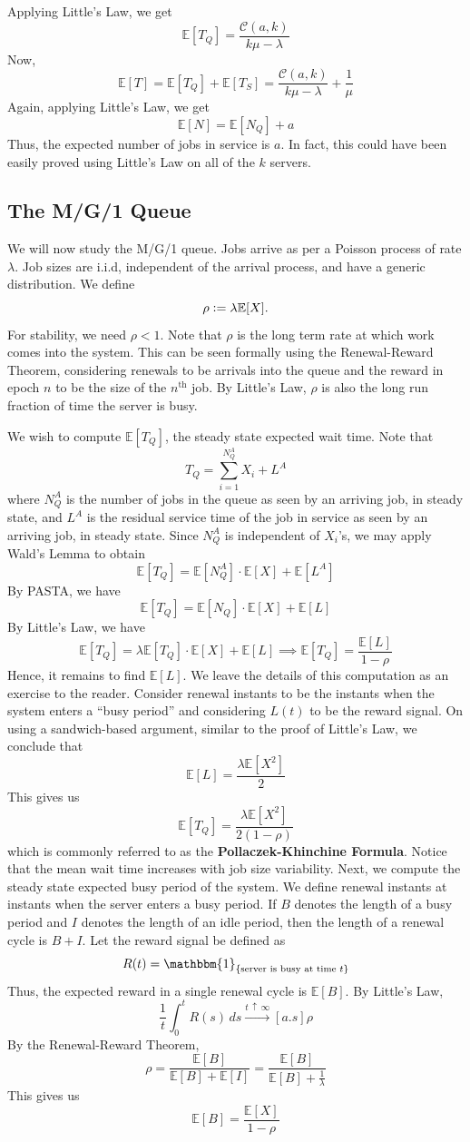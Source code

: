 \documentclass[12pt]{article}
\def\E{\mathbb{E}}
\theoremstyle{definition}
\begin{document}
Applying Little's Law, we get
\[
    \E[T_Q] = \frac{\mathcal{C}(a,k)}{k\mu - \lambda}
\]
Now, 
\[
    \E[T] = \E[T_Q] + \E[T_S] = \frac{\mathcal{C}(a,k)}{k\mu-\lambda} + \frac{1}{\mu}
\]
Again, applying Little's Law, we get
\[
    \E[N] = \E[N_Q] + a
\]
Thus, the expected number of jobs in service is $a$. In fact, this could have been easily proved using Little's Law on all of the $k$ servers.

\subsection{The M/G/1 Queue}

We will now study the M/G/1 queue. Jobs arrive as per a Poisson process of rate $\lambda$. Job sizes are i.i.d, independent of the arrival process, and have a generic distribution. We define 
\[
    \rho \vcentcolon= \lambda \E[X].
\]
For stability, we need $\rho < 1$. Note that $\rho$ is the long term rate at which work comes into the system. This can be seen formally using the Renewal-Reward Theorem, considering renewals to be arrivals into the queue and the reward in epoch $n$ to be the size of the $n^{\text{th}}$ job. By Little's Law, $\rho$ is also the long run fraction of time the server is busy. 

We wish to compute $\E[T_Q]$, the steady state expected wait time. Note that
\[
    T_Q = \sum_{i=1}^{N_Q^A} X_i + L^A
\]
where $N_Q^A$ is the number of jobs in the queue as seen by an arriving job, in steady state, and $L^A$ is the residual service time of the job in service as seen by an arriving job, in steady state. Since $N_Q^A$ is independent of $X_i$'s, we may apply Wald's Lemma to obtain
\[
    \E[T_Q] = \E[N_Q^A] \cdot \E[X] + \E[L^A]
\]
By PASTA, we have
\[
    \E[T_Q] = \E[N_Q] \cdot \E[X] + \E[L]
\]
By Little's Law, we have
\[
    \E[T_Q] = \lambda \E[T_Q] \cdot \E[X] + \E[L] \implies \E[T_Q] = \frac{\E[L]}{1-\rho}
\]
Hence, it remains to find $\E[L]$. We leave the details of this computation as an exercise to the reader. Consider renewal instants to be the instants when the system enters a ``busy period'' and considering $L(t)$ to be the reward signal. On using a sandwich-based argument, similar to the proof of Little's Law, we conclude that
\[
    \E[L] = \frac{\lambda \E[X^2]}{2}
\]
This gives us
\[
    \boxed{\E[T_Q] = \frac{\lambda \E[X^2]}{2(1-\rho)}}
\]
which is commonly referred to as the \textbf{Pollaczek-Khinchine Formula}. Notice that the mean wait time increases with job size variability. Next, we compute the steady state expected busy period of the system. We define renewal instants at instants when the server enters a busy period. If $B$ denotes the length of a busy period and $I$ denotes the length of an idle period, then the length of a renewal cycle is $B+I$. Let the reward signal be defined as
\[
    R(t) = \mathbbm{1}_{\left\{\text{server is busy at time }t\right\}}
\]
Thus, the expected reward in a single renewal cycle is $\E[B]$. By Little's Law,
\[
    \frac{1}{t} \int_0^t R(s) \, ds \xrightarrow{t \, \uparrow \, \infty}[a.s] \rho
\]
By the Renewal-Reward Theorem, 
\[
    \rho = \frac{\E[B]}{\E[B] + \E[I]} = \frac{\E[B]}{\E[B] + \frac{1}{\lambda}}
\]
This gives us
\[
    \E[B] = \frac{\E[X]}{1-\rho}
\]
\end{document}
